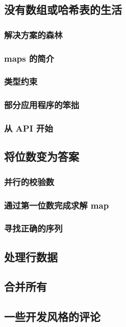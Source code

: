 \documentclass[./main.tex]{subfiles}
\begin{document}
\subsection*{没有数组或哈希表的生活}

\subsubsection*{解决方案的森林}

\subsubsection*{maps 的简介}

\subsubsection*{类型约束}

\subsubsection*{部分应用程序的笨拙}

\subsubsection*{从 API 开始}

\subsection*{将位数变为答案}

\subsubsection*{并行的校验数}

\subsubsection*{通过第一位数完成求解 map}

\subsubsection*{寻找正确的序列}

\subsection*{处理行数据}

\subsection*{合并所有}

\subsection*{一些开发风格的评论}
\end{document}
